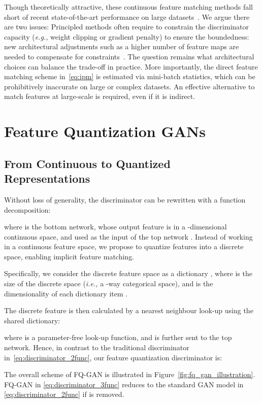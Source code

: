 \documentclass{article}
\newcommand{\ie}[0]{\emph{i.e., }}
\newcommand{\eg}[0]{\emph{e.g., }}
\begin{document}
Though theoretically attractive, these continuous feature matching methods fall short of recent state-of-the-art performance on large datasets~\cite{brock2018large,karras2019style}. We argue there are two issues: 
 Principled methods often require to constrain the discriminator capacity (\eg weight clipping or gradient penalty) to ensure the boundedness: new architectural adjustments such as a higher number of feature maps are needed to compensate for constraints~\cite{mroueh2017mcgan}. The question remains what architectural choices can balance the trade-off in practice.
 More importantly, the direct feature matching scheme in~\eqref{eq:ipm} is estimated via mini-batch statistics, which can be prohibitively inaccurate on large or complex datasets. An effective alternative to match features at large-scale is required, even if it is indirect. 






\section{Feature Quantization GANs}


\subsection{From Continuous to Quantized Representations}
Without loss of generality, the discriminator  can be rewritten with a function decomposition: 

where  is the bottom network, whose output feature  is in a -dimensional continuous space, and used as the input of the top network .
Instead of working in a continuous feature space, we propose to quantize features into a discrete space, enabling implicit feature matching. 



Specifically, we consider the discrete feature space as a dictionary , where  is the size of the discrete space (\ie a -way categorical space), and  is the dimensionality of each dictionary item .

The discrete feature  is then calculated by a nearest neighbour look-up using the shared dictionary:

where  is a parameter-free look-up function, and  is further sent to the top network. Hence, in contrast to the traditional discriminator in~\eqref{eq:discriminator_2func}, our feature quantization discriminator is:   

The overall scheme of FQ-GAN is illustrated in Figure~\ref{fig:fq_gan_illustration}. 
FQ-GAN in \eqref{eq:discriminator_3func} reduces to the standard GAN model in \eqref{eq:discriminator_2func} if  is removed.
\end{document}
